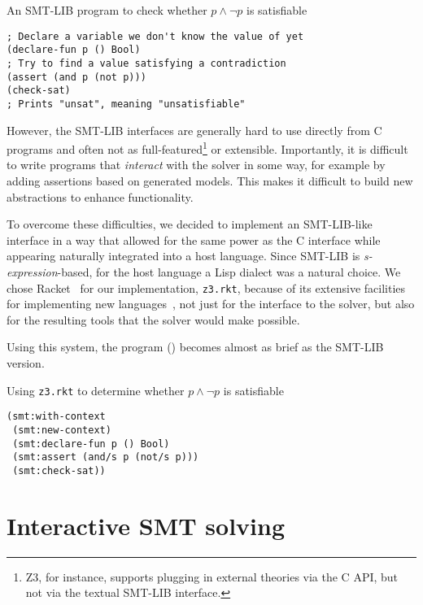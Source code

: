 \begin{program}
\caption{An SMT-LIB program to check whether $p \wedge \neg p$ is satisfiable}
\label{fig:smtlib-prop}
\begin{verbatim}
; Declare a variable we don't know the value of yet
(declare-fun p () Bool)
; Try to find a value satisfying a contradiction
(assert (and p (not p)))
(check-sat)
; Prints "unsat", meaning "unsatisfiable"
\end{verbatim}
\end{program}

However, the SMT-LIB interfaces are generally hard to use directly from C
programs and often not as full-featured\footnote{Z3, for instance, supports
plugging in external theories via the C API, but not via the textual SMT-LIB
interface.}  or extensible. Importantly, it is difficult to write programs
that \textit{interact} with the solver in some way, for example by adding
assertions based on generated models. This makes it difficult to build new
abstractions to enhance functionality.

To overcome these difficulties, we decided to implement an SMT-LIB-like
interface in a way that allowed for the same power as the C interface while
appearing naturally integrated into a host language. Since SMT-LIB is {\em
s-expression}-based, for the host language a Lisp dialect was a natural
choice. We chose Racket~\cite{racket} for our implementation, \texttt{z3.rkt},
because of its extensive facilities for implementing new languages~\cite
{Tobin-Hochstadt:11}, not just for the interface to the solver, but also for
the resulting tools that the solver would make possible.

Using this system, the program () becomes almost as brief
as the SMT-LIB version.

\begin{program}
\caption{Using \texttt{z3.rkt} to determine whether $p \wedge \neg p$ is satisfiable}
\label{fig:rkt-prop}
\begin{verbatim}
(smt:with-context
 (smt:new-context)
 (smt:declare-fun p () Bool)
 (smt:assert (and/s p (not/s p)))
 (smt:check-sat))
\end{verbatim}
\end{program}

\section{Interactive SMT solving}
\label{sec:interactive}

